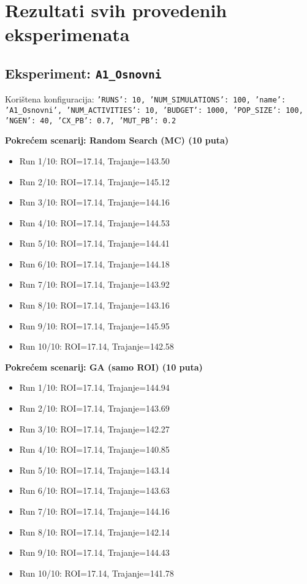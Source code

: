 \section*{Rezultati svih provedenih eksperimenata}

\subsection*{Eksperiment: \texttt{A1\_Osnovni}}
Korištena konfiguracija: \texttt{'RUNS': 10, 'NUM\_SIMULATIONS': 100, 'name': 'A1\_Osnovni', 'NUM\_ACTIVITIES': 10, 'BUDGET': 1000, 'POP\_SIZE': 100, 'NGEN': 40, 'CX\_PB': 0.7, 'MUT\_PB': 0.2}

\textbf{Pokrećem scenarij: Random Search (MC) (10 puta)}
\begin{itemize}
    \item Run 1/10: ROI=17.14, Trajanje=143.50
    \item Run 2/10: ROI=17.14, Trajanje=145.12
    \item Run 3/10: ROI=17.14, Trajanje=144.16
    \item Run 4/10: ROI=17.14, Trajanje=144.53
    \item Run 5/10: ROI=17.14, Trajanje=144.41
    \item Run 6/10: ROI=17.14, Trajanje=144.18
    \item Run 7/10: ROI=17.14, Trajanje=143.92
    \item Run 8/10: ROI=17.14, Trajanje=143.16
    \item Run 9/10: ROI=17.14, Trajanje=145.95
    \item Run 10/10: ROI=17.14, Trajanje=142.58
\end{itemize}

\textbf{Pokrećem scenarij: GA (samo ROI) (10 puta)}
\begin{itemize}
    \item Run 1/10: ROI=17.14, Trajanje=144.94
    \item Run 2/10: ROI=17.14, Trajanje=143.69
    \item Run 3/10: ROI=17.14, Trajanje=142.27
    \item Run 4/10: ROI=17.14, Trajanje=140.85
    \item Run 5/10: ROI=17.14, Trajanje=143.14
    \item Run 6/10: ROI=17.14, Trajanje=143.63
    \item Run 7/10: ROI=17.14, Trajanje=144.16
    \item Run 8/10: ROI=17.14, Trajanje=142.14
    \item Run 9/10: ROI=17.14, Trajanje=144.43
    \item Run 10/10: ROI=17.14, Trajanje=141.78
\end{itemize}

